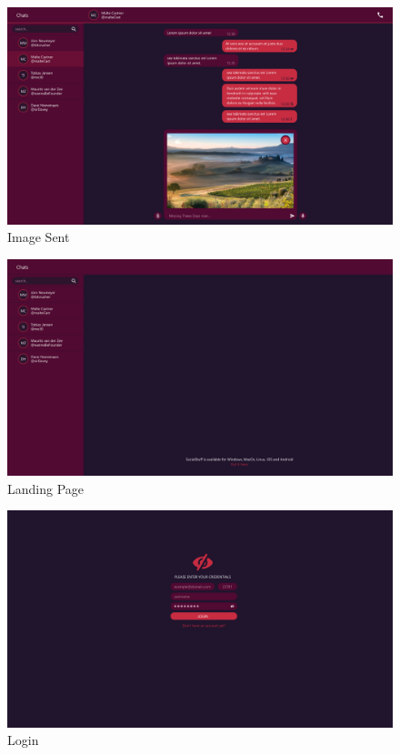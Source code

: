 \begin{figure}[h]
    \centering
    \includegraphics[width=1.0\textwidth]{./graphics/wireframes/ImageSent}
    \caption{Image Sent}
    \label{fig:figure21}
\end{figure}

\begin{figure}[h]
    \centering
    \includegraphics[width=1.0\textwidth]{./graphics/wireframes/LandingPage}
    \caption{Landing Page}
    \label{fig:figure22}
\end{figure}

\begin{figure}[h]
    \centering
    \includegraphics[width=1.0\textwidth]{./graphics/wireframes/Login}
    \caption{Login}
    \label{fig:figure23}
\end{figure}

